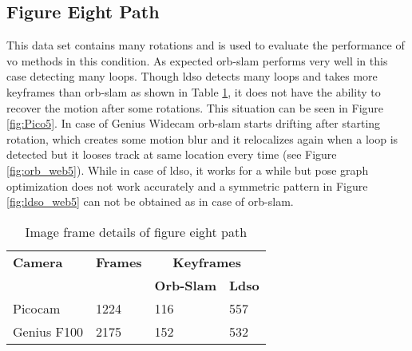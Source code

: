 \subsection{Figure Eight Path}
This data set contains many rotations and is used to evaluate the performance of \acrshort{vo} methods in this condition. As expected \acrshort{orb}-\acrshort{slam} performs very well in this case detecting many loops. Though \acrshort{ldso} detects many loops and takes more keyframes than \acrshort{orb}-\acrshort{slam} as shown in Table \ref{table:eight}, it does not have the ability to recover the motion after some rotations. This situation can be seen in Figure \ref{fig:Pico5}. In case of Genius Widecam \acrshort{orb}-\acrshort{slam} starts drifting after starting rotation, which creates some motion blur and it relocalizes again when a loop is detected but it looses track at same location every time (see Figure \ref{fig:orb_web5}). While in case of \acrshort{ldso}, it works for a while but pose graph optimization does not work accurately and a symmetric pattern in Figure \ref{fig:ldso_web5} can not be obtained as in case of \acrshort{orb}-\acrshort{slam}.\\
\begin{table}[H]
	\centering
	\renewcommand{\arraystretch}{1.5}
	\begin{tabular}{ l| l| l |l }
		\textbf{Camera} & \textbf{Frames} & \multicolumn{2}{c}{\textbf{Keyframes}}  \\    
		&      & \textbf{Orb-Slam}  & \textbf{Ldso}  \\
		\hline
		Picocam & 1224 &  116  & 557 \\ 
		\hline
		Genius F100 & 2175 &  152  & 532 \\ 
	\end{tabular}
	\caption{Image frame details of figure eight path}
	\label{table:eight}
\end{table}

